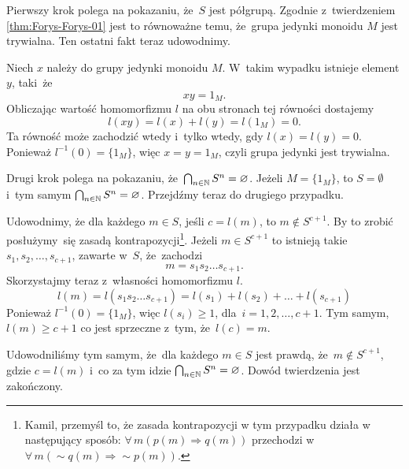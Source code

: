 \documentclass[a4paper,11pt]{article}
\begin{document}
Pierwszy krok polega na pokazaniu, że~$S$ jest półgrupą. Zgodnie
z~twierdzeniem \eqref{thm:Forys-Forys-01} jest to równoważne temu, że~grupa
jedynki monoidu $M$ jest trywialna. Ten ostatni fakt teraz udowodnimy.

Niech $x$ należy do grupy jedynki monoidu $M$. W~takim wypadku istnieje
element $y$, taki~że
\begin{equation}
  \label{eq:Forys-Forys-44}
  x y = 1_{ M }.
\end{equation}
Obliczając wartość homomorfizmu $l$ na obu stronach tej równości dostajemy
\begin{equation}
  \label{eq:Forys-Forys-45}
  l( x y ) = l( x ) + l( y ) = l( 1_{ M } ) = 0.
\end{equation}
Ta równość może zachodzić wtedy i~tylko wtedy, gdy $l( x ) = l( y ) = 0$.
Ponieważ $l^{ -1 }( 0 ) = \{ 1_{ M } \}$, więc $x = y = 1_{ M }$, czyli grupa
jedynki jest trywialna.

Drugi krok polega na pokazaniu, że~$\bigcap_{ n \in \mathbb{N} } S^{ n } = \varnothing$. Jeżeli
$M = \{ 1_{ M } \}$, to $S = \emptyset$ i~tym samym $\bigcap_{ n \in \mathbb{N} } S^{ n } = \varnothing$.
Przejdźmy teraz do drugiego przypadku.

Udowodnimy, że dla każdego $m \in S$, jeśli $c = l( m )$, to
$m \notin S^{ c + 1 }$. By to zrobić posłużymy~się zasadą
kontrapozycji\footnote{Kamil,
  przemyśl to, że zasada kontrapozycji w tym przypadku działa w następujący
  sposób: $\forall \, m ( p( m ) \Rightarrow q( m ) )$ przechodzi
  w~$\forall \, m ( \sim q( m ) \Rightarrow \sim p( m ) )$.}. Jeżeli $m \in S^{ c + 1 }$ to
istnieją takie $s_{ 1 }, s_{ 2 }, \ldots, s_{ c + 1 }$, zawarte w~$S$, że~zachodzi
\begin{equation}
  \label{eq:Forys-Forys-46}
  m = s_{ 1 } s_{ 2 } \ldots s_{ c + 1 }.
\end{equation}
Skorzystajmy teraz z~własności homomorfizmu $l$.
\begin{equation}
  \label{eq:Forys-Forys-47}
  l( m ) = l( s_{ 1 } s_{ 2 } \ldots s_{ c + 1 } ) =
  l( s_{ 1 } ) + l( s_{ 2 } ) + \ldots + l( s_{ c + 1 } )
\end{equation}
Ponieważ $l^{ -1 }( 0 ) = \{ 1_{ M } \}$, więc $l( s_{ i } ) \geq 1$,
dla~$i = 1, 2, \ldots, c + 1$. Tym samym, $l( m ) \geq c + 1$ co jest sprzeczne z~tym, że~$l( c ) = m$.

Udowodniliśmy tym samym, że~dla każdego $m \in S$ jest prawdą,
że~$m \notin S^{ c + 1 }$, gdzie $c = l( m )$ i~co za tym idzie
$\bigcap_{ n \in \mathbb{N} } S^{ n } = \varnothing$. Dowód twierdzenia jest zakończony.
\end{document}
